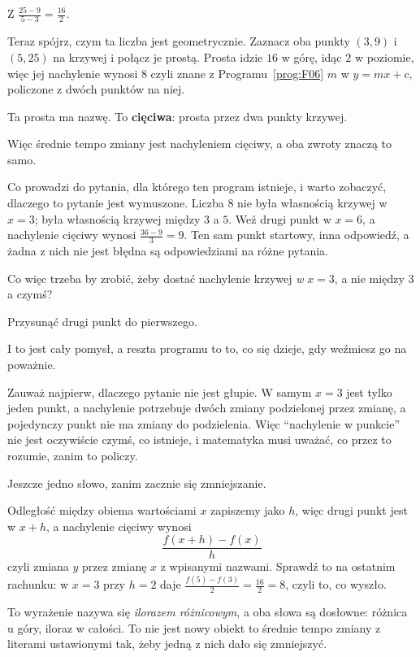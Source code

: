 \begin{fr}
Z $\frac{25 - 9}{5 - 3} = \frac{16}{2}$.

Teraz spójrz, czym ta liczba jest geometrycznie. Zaznacz oba punkty $(3, 9)$ i
$(5, 25)$ na krzywej i połącz je prostą. Prosta idzie $16$ w górę, idąc $2$ w
poziomie, więc jej nachylenie wynosi $8$ \dash{} czyli znane z
Programu~\ref{prog:F06} $m$ w $y = mx + c$, policzone z dwóch punktów na niej.

Ta prosta ma nazwę. To \textbf{cięciwa}: prosta przez dwa punkty krzywej.

Więc średnie tempo zmiany jest nachyleniem cięciwy, a oba zwroty znaczą to
samo.

Co prowadzi do pytania, dla którego ten program istnieje, i warto zobaczyć,
dlaczego to pytanie jest wymuszone. Liczba $8$ nie była własnością krzywej w
$x = 3$; była własnością krzywej między $3$ a $5$. Weź drugi punkt w $x = 6$,
a nachylenie cięciwy wynosi $\frac{36 - 9}{3} = 9$. Ten sam punkt startowy,
inna odpowiedź, a żadna z nich nie jest błędna \dash{} są odpowiedziami na
różne pytania.

Co więc trzeba by zrobić, żeby dostać nachylenie krzywej \emph{w} $x = 3$, a
nie między $3$ a czymś?
\dotline
\nextframe
\end{fr}

\begin{fr}
\begin{ansblock}
Przysunąć drugi punkt do pierwszego.
\end{ansblock}

I to jest cały pomysł, a reszta programu to to, co się dzieje, gdy weźmiesz go
na poważnie.

Zauważ najpierw, dlaczego pytanie nie jest głupie. W samym $x = 3$ jest tylko
jeden punkt, a nachylenie potrzebuje dwóch \dash{} zmiany podzielonej przez
zmianę, a pojedynczy punkt nie ma zmiany do podzielenia. Więc
\enquote{nachylenie w punkcie} nie jest oczywiście czymś, co istnieje, i
matematyka musi uważać, co przez to rozumie, zanim to policzy.

\end{fr}

\begin{fr}
Jeszcze jedno słowo, zanim zacznie się zmniejszanie.

Odległość między obiema wartościami $x$ zapiszemy jako $h$, więc drugi punkt
jest w $x + h$, a nachylenie cięciwy wynosi
\[ \frac{f(x + h) - f(x)}{h} \]
czyli zmiana $y$ przez zmianę $x$ z wpisanymi nazwami. Sprawdź to na ostatnim
rachunku: w $x = 3$ przy $h = 2$ daje
$\frac{f(5) - f(3)}{2} = \frac{16}{2} = 8$, czyli to, co wyszło.

\begin{note}
To wyrażenie nazywa się \emph{ilorazem różnicowym}, a oba słowa są dosłowne:
różnica u góry, iloraz w całości. To nie jest nowy obiekt \dash{} to średnie
tempo zmiany z literami ustawionymi tak, żeby jedną z nich dało się zmniejszyć.
\end{note}
\end{fr}

